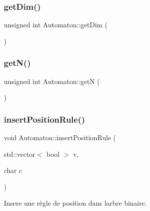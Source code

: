\mbox{\label{class_automaton_a27b050dff4898c55c20e2950e54b2fc9}} 
\subsubsection{\texorpdfstring{get\+Dim()}{getDim()}}
{\footnotesize\ttfamily unsigned int Automaton\+::get\+Dim (\begin{DoxyParamCaption}{ }\end{DoxyParamCaption})\hspace{0.3cm}{\ttfamily [inline]}}

\mbox{\label{class_automaton_af61fbe8bf05c0b2223d7a67f3e429f3e}} 
\subsubsection{\texorpdfstring{get\+N()}{getN()}}
{\footnotesize\ttfamily unsigned int Automaton\+::getN (\begin{DoxyParamCaption}{ }\end{DoxyParamCaption})\hspace{0.3cm}{\ttfamily [inline]}}

\mbox{\label{class_automaton_ae77214bcd75f24d2cb56506e300a7991}} 
\subsubsection{\texorpdfstring{insert\+Position\+Rule()}{insertPositionRule()}}
{\footnotesize\ttfamily void Automaton\+::insert\+Position\+Rule (\begin{DoxyParamCaption}\item[{std\+::vector$<$ bool $>$}]{v,  }\item[{char}]{c }\end{DoxyParamCaption})\hspace{0.3cm}{\ttfamily [inline]}}



Insere une règle de position dans l\textquotesingle{}arbre binaire. 

